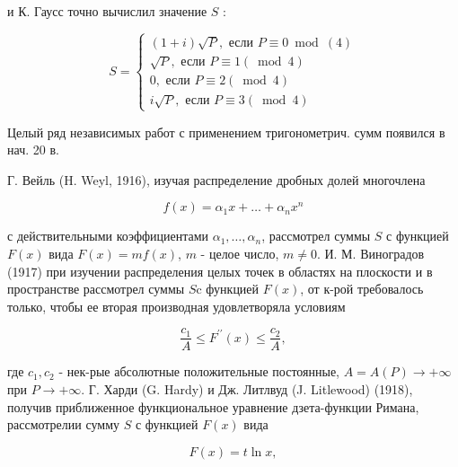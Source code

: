 \documentclass[10pt]{article}
\begin{document}
и К. Гаусс точно вычислил значение $S$ :



\[

S=\left\{\begin{array}{r}

(1+i) \sqrt{P}, \text { если } P \equiv 0 \bmod (4) \\

\sqrt{P}, \text { если } P \equiv 1(\bmod 4) \\

0, \text { если } P \equiv 2(\bmod 4) \\

i \sqrt{P}, \text { если } P \equiv 3(\bmod 4)

\end{array}\right.

\]



Целый ряд независимых работ с применением тригонометрич. сумм появился в нач. 20 в.



Г. Вейль (H. Weyl, 1916), изучая распределение дробных долей многочлена



\[

f(x)=\alpha_{1} x+\ldots+\alpha_{n} x^{n}

\]



с действительными коэффициентами $\alpha_{1}, \ldots, \alpha_{n}$, рассмотрел суммы $S$ с функцией $F(x)$ вида $F(x)=m f(x)$, $m$ - целое число, $m \neq 0$. И. М. Виноградов (1917) при изучении распределения целых точек в областях на плоскости и в пространстве рассмотрел суммы $S \mathrm{c}$ функцией $F(x)$, от к-рой требовалось только, чтобы ее вторая производная удовлетворяла условиям



\[

\frac{c_{1}}{A} \leqslant F^{\prime \prime}(x) \leqslant \frac{c_{2}}{A},

\]



где $c_{1}, c_{2}$ - нек-рые абсолютные положительные постоянные, $A=A(P) \rightarrow+\infty$ при $P \rightarrow+\infty$. Г. Харди (G. Hardy) и Дж. Литлвуд (J. Litlewood) (1918), получив приближенное функциональное уравнение дзета-функции Римана, рассмотрелии сумму $S$ с функцией $F(x)$ вида



\[

F(x)=t \ln x,

\]
\end{document}

